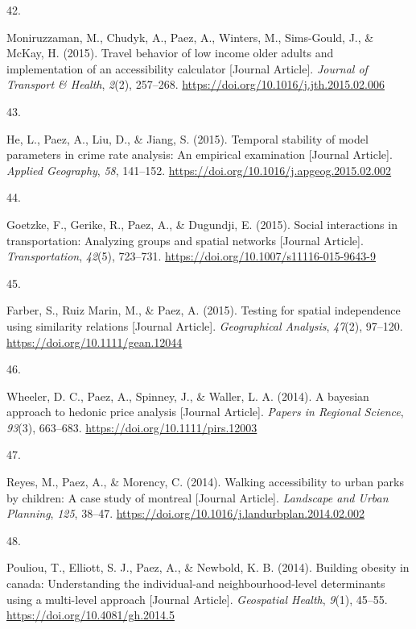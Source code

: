 \documentclass[11pt,a4paper,]{awesome-cv}
\newlength{\csllabelwidth}
\newcommand{\CSLLeftMargin}[1]{\parbox[t]{\csllabelwidth}{#1}}
\newcommand{\CSLRightInline}[1]{\parbox[t]{\linewidth - \csllabelwidth}{#1}}
\begin{document}
\leavevmode{}%
\CSLLeftMargin{42. }
\CSLRightInline{Moniruzzaman, M., Chudyk, A., Paez, A., Winters, M.,
Sims-Gould, J., \& McKay, H. (2015). Travel behavior of low income older
adults and implementation of an accessibility calculator {[}Journal
Article{]}. \emph{Journal of Transport \& Health}, \emph{2}(2),
257--268. \url{https://doi.org/10.1016/j.jth.2015.02.006}}

\leavevmode{}%
\CSLLeftMargin{43. }
\CSLRightInline{He, L., Paez, A., Liu, D., \& Jiang, S. (2015). Temporal
stability of model parameters in crime rate analysis: An empirical
examination {[}Journal Article{]}. \emph{Applied Geography}, \emph{58},
141--152. \url{https://doi.org/10.1016/j.apgeog.2015.02.002}}

\leavevmode{}%
\CSLLeftMargin{44. }
\CSLRightInline{Goetzke, F., Gerike, R., Paez, A., \& Dugundji, E.
(2015). Social interactions in transportation: Analyzing groups and
spatial networks {[}Journal Article{]}. \emph{Transportation},
\emph{42}(5), 723--731. \url{https://doi.org/10.1007/s11116-015-9643-9}}

\leavevmode{}%
\CSLLeftMargin{45. }
\CSLRightInline{Farber, S., Ruiz Marin, M., \& Paez, A. (2015). Testing
for spatial independence using similarity relations {[}Journal
Article{]}. \emph{Geographical Analysis}, \emph{47}(2), 97--120.
\url{https://doi.org/10.1111/gean.12044}}

\leavevmode{}%
\CSLLeftMargin{46. }
\CSLRightInline{Wheeler, D. C., Paez, A., Spinney, J., \& Waller, L. A.
(2014). A bayesian approach to hedonic price analysis {[}Journal
Article{]}. \emph{Papers in Regional Science}, \emph{93}(3), 663--683.
\url{https://doi.org/10.1111/pirs.12003}}

\leavevmode{}%
\CSLLeftMargin{47. }
\CSLRightInline{Reyes, M., Paez, A., \& Morency, C. (2014). Walking
accessibility to urban parks by children: A case study of montreal
{[}Journal Article{]}. \emph{Landscape and Urban Planning}, \emph{125},
38--47. \url{https://doi.org/10.1016/j.landurbplan.2014.02.002}}

\leavevmode{}%
\CSLLeftMargin{48. }
\CSLRightInline{Pouliou, T., Elliott, S. J., Paez, A., \& Newbold, K. B.
(2014). Building obesity in canada: Understanding the individual-and
neighbourhood-level determinants using a multi-level approach {[}Journal
Article{]}. \emph{Geospatial Health}, \emph{9}(1), 45--55.
\url{https://doi.org/10.4081/gh.2014.5}}
\end{document}
